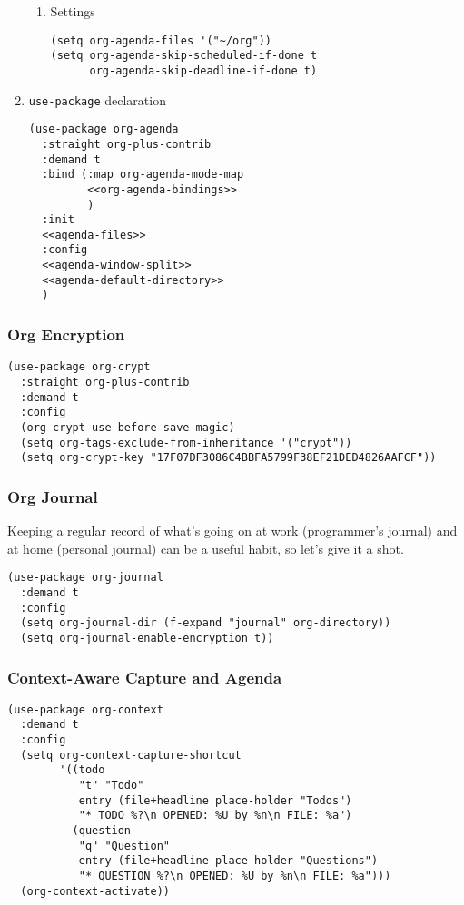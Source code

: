 \documentclass[11pt]{article}
\begin{document}
\begin{enumerate}
\begin{enumerate}
\item Settings
\label{sec:org7aaaa9e}
\begin{verbatim}
(setq org-agenda-files '("~/org"))
(setq org-agenda-skip-scheduled-if-done t
      org-agenda-skip-deadline-if-done t)
\end{verbatim}
\end{enumerate}
\item \texttt{use-package} declaration
\label{sec:orga51040b}
\begin{verbatim}
(use-package org-agenda
  :straight org-plus-contrib
  :demand t
  :bind (:map org-agenda-mode-map
         <<org-agenda-bindings>>
         )
  :init
  <<agenda-files>>
  :config
  <<agenda-window-split>>
  <<agenda-default-directory>>
  )
\end{verbatim}
\end{enumerate}
\subsubsection{Org Encryption}
\label{sec:orge38bed1}
\begin{verbatim}
(use-package org-crypt
  :straight org-plus-contrib
  :demand t
  :config
  (org-crypt-use-before-save-magic)
  (setq org-tags-exclude-from-inheritance '("crypt"))
  (setq org-crypt-key "17F07DF3086C4BBFA5799F38EF21DED4826AAFCF"))
\end{verbatim}
\subsubsection{Org Journal}
\label{sec:orgd05cb09}
Keeping a regular record of what's going on at work (programmer's
journal) and at home (personal journal) can be a useful habit, so
let's give it a shot.
\begin{verbatim}
(use-package org-journal
  :demand t
  :config
  (setq org-journal-dir (f-expand "journal" org-directory))
  (setq org-journal-enable-encryption t))
\end{verbatim}
\subsubsection{Context-Aware Capture and Agenda}
\label{sec:org3e9f733}
\begin{verbatim}
(use-package org-context
  :demand t
  :config
  (setq org-context-capture-shortcut
        '((todo
           "t" "Todo"
           entry (file+headline place-holder "Todos")
           "* TODO %?\n OPENED: %U by %n\n FILE: %a")
          (question
           "q" "Question"
           entry (file+headline place-holder "Questions")
           "* QUESTION %?\n OPENED: %U by %n\n FILE: %a")))
  (org-context-activate))
\end{verbatim}
\end{document}
